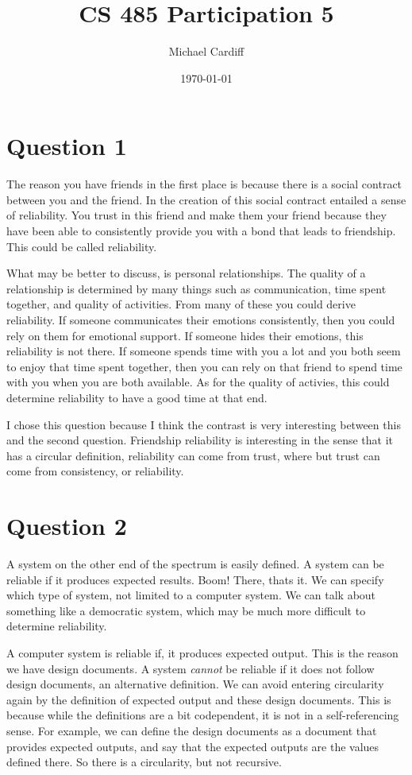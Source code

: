 \documentclass[12pt]{article}
\title{CS 485 Participation 5}
\author{Michael Cardiff}
\date{\today}
\begin{document}
\maketitle
\section*{Question 1}
The reason you have friends in the first place is because there is a social contract between you and the friend. In the creation of this social contract entailed a sense of reliability. You trust in this friend and make them your friend because they have been able to consistently provide you with a bond that leads to friendship. This could be called reliability.

What may be better to discuss, is personal relationships. The quality of a relationship is determined by many things such as communication, time spent together, and quality of activities. From many of these you could derive reliability. If someone communicates their emotions consistently, then you could rely on them for emotional support. If someone hides their emotions, this reliability is not there. If someone spends time with you a lot and you both seem to enjoy that time spent together, then you can rely on that friend to spend time with you when you are both available. As for the quality of activies, this could determine reliability to have a good time at that end.

I chose this question because I think the contrast is very interesting between this and the second question. Friendship reliability is interesting in the sense that it has a circular definition, reliability can come from trust, where but trust can come from consistency, or reliability. 
\section*{Question 2}
A system on the other end of the spectrum is easily defined. A system can be reliable if it produces expected results. Boom! There, thats it. We can specify which type of system, not limited to a computer system. We can talk about something like a democratic system, which may be much more difficult to determine reliability.

A computer system is reliable if, it produces expected output. This is the reason we have design documents. A system \textit{cannot} be reliable if it does not follow design documents, an alternative definition. We can avoid entering circularity again by the definition of expected output and these design documents. This is because while the definitions are a bit codependent, it is not in a self-referencing sense. For example, we can define the design documents as a document that provides expected outputs, and say that the expected outputs are the values defined there. So there is a circularity, but not recursive.
\end{document}
